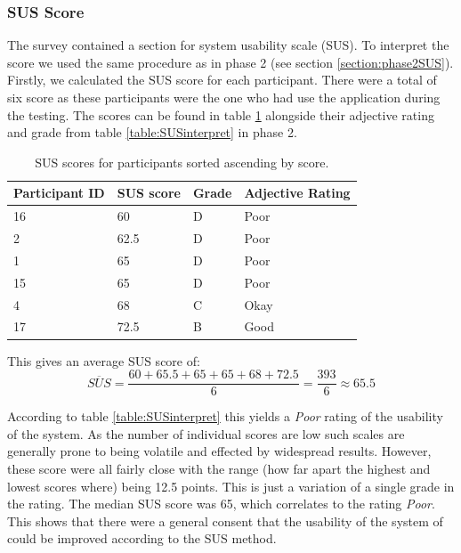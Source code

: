 \subsubsection{SUS Score}
The survey contained a section for system usability scale (SUS). To interpret the score we used the same procedure as in phase 2 (see section \ref{section:phase2SUS}). Firstly, we calculated the SUS score for each participant. There were a total of six score as these participants were the one who had use the application during the testing. The scores can be found in table \ref{table:phase3SUSscores} alongside their adjective rating and grade from table \ref{table:SUSinterpret} in phase 2.


\begin{table}[H]
\centering
\begin{tabular}{l|l|l|l}
{\textbf{Participant ID}} & { \textbf{SUS score}} & { \textbf{Grade}} & { \textbf{Adjective Rating}}\\ \hline
16   & 60   &  D & Poor                                   \\ 
2   & 62.5 &  D & Poor                                    \\ 
1   & 65 &  D & Poor                                   \\ 
15   & 65 &  D & Poor                                     \\ 
4   & 68 &  C & Okay                                    \\ 
17   & 72.5 &  B & Good                                     \\ 
\end{tabular}
\caption{SUS scores for participants sorted ascending by score.}
\label{table:phase3SUSscores}
\end{table}

This gives an average SUS score of: 
\[\overline{SUS} = \frac{60 + 65.5 + 65 + 65 + 68 + 72.5}{6} = \frac{393}{6} \approx 65.5\]

According to table \ref{table:SUSinterpret} this yields a \textit{Poor} rating of the usability of the system. As the number of individual scores are low such scales are generally prone to being volatile and effected by widespread results. However, these score were all fairly close with the range (how far apart the highest and lowest scores where) being 12.5 points. This is just a variation of a single grade in the rating. The median SUS score was 65, which correlates to the rating \textit{Poor}. This shows that there were a general consent that the usability of the system of could be improved according to the SUS method. 


\cleardoublepage